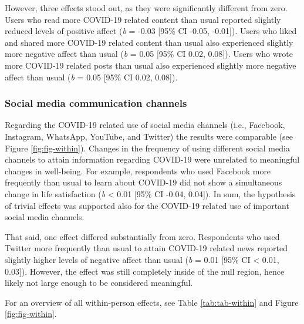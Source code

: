 \documentclass[
  man,mask,floatsintext]{apa7}
\begin{document}
However, three effects stood out, as they were significantly different from zero.
Users who read more COVID-19 related content than usual reported slightly reduced levels of positive affect (\emph{b} = -0.03 {[}95\% CI -0.05, -0.01{]}).
Users who liked and shared more COVID-19 related content than usual also experienced slightly more negative affect than usual (\emph{b} = 0.05 {[}95\% CI 0.02, 0.08{]}).
Users who wrote more COVID-19 related posts than usual also experienced slightly more negative affect than usual (\emph{b} = 0.05 {[}95\% CI 0.02, 0.08{]}).

\hypertarget{social-media-communication-channels}{%
\subsubsection{Social media communication channels}\label{social-media-communication-channels}}

Regarding the COVID-19 related use of social media channels (i.e., Facebook, Instagram, WhatsApp, YouTube, and Twitter) the results were comparable (see Figure \ref{fig:fig-within}).
Changes in the frequency of using different social media channels to attain information regarding COVID-19 were unrelated to meaningful changes in well-being.
For example, respondents who used Facebook more frequently than usual to learn about COVID-19 did not show a simultaneous change in life satisfaction (\emph{b} \textless{} 0.01 {[}95\% CI -0.04, 0.04{]}).
In sum, the hypothesis of trivial effects was supported also for the COVID-19 related use of important social media channels.

That said, one effect differed substantially from zero.
Respondents who used Twitter more frequently than usual to attain COVID-19 related news reported slightly higher levels of negative affect than usual (\emph{b} = 0.01 {[}95\% CI \textless{} 0.01, 0.03{]}).
However, the effect was still completely inside of the null region, hence likely not large enough to be considered meaningful.

For an overview of all within-person effects, see Table \ref{tab:tab-within} and Figure \ref{fig:fig-within}.
\end{document}
